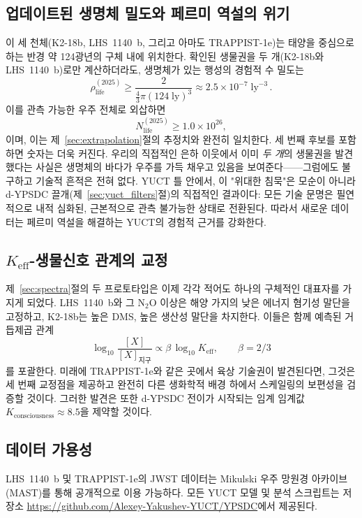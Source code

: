 \documentclass[11pt,a4paper]{article}
\begin{document}
	\subsection{업데이트된 생명체 밀도와 페르미 역설의 위기}
	이 세 천체(K2-18b, LHS~1140~b, 그리고 아마도 TRAPPIST-1e)는 태양을 중심으로 하는 반경 약 124광년의 구체 내에 위치한다. 확인된 생물권을 두 개(K2-18b와 LHS~1140~b)로만 계산하더라도, 생명체가 있는 행성의 경험적 수 밀도는
	\begin{equation}
		\rho_{\mathrm{life}}^{(2025)} \ge \frac{2}{\frac{4}{3}\pi (124\;\mathrm{ly})^{3}} \approx 2.5\times10^{-7}\;\mathrm{ly}^{-3}\, .
	\end{equation}
	이를 관측 가능한 우주 전체로 외삽하면
	\begin{equation}
		N_{\mathrm{life}}^{(2025)} \ge 1.0\times10^{26} ,
	\end{equation}
	이며, 이는 제~\ref{sec:extrapolation}절의 추정치와 완전히 일치한다. 세 번째 후보를 포함하면 숫자는 더욱 커진다. 우리의 직접적인 은하 이웃에서 이미 \emph{두 개}의 생물권을 발견했다는 사실은 생명체의 바다가 우주를 가득 채우고 있음을 보여준다——그럼에도 불구하고 기술적 흔적은 전혀 없다. YUCT 틀 안에서, 이 "위대한 침묵"은 모순이 아니라 d-YPSDC 끌개(제~\ref{sec:yuct_filters}절)의 직접적인 결과이다: 모든 기술 문명은 필연적으로 내적 심화된, 근본적으로 관측 불가능한 상태로 전환된다. 따라서 새로운 데이터는 페르미 역설을 해결하는 YUCT의 경험적 근거를 강화한다.
	
	\subsection{\(K_{\mathrm{eff}}\)-생물신호 관계의 교정}
	제~\ref{sec:spectra}절의 두 프로토타입은 이제 각각 적어도 하나의 구체적인 대표자를 가지게 되었다. LHS~1140~b와 그 N$_2$O 이상은 해양 가지의 낮은 에너지 혐기성 말단을 고정하고, K2-18b는 높은 DMS, 높은 생산성 말단을 차지한다. 이들은 함께 예측된 거듭제곱 관계
	\begin{equation}
		\log_{10} \frac{[X]}{[X]_{\mathrm{지구}}} \propto \beta\,\log_{10} K_{\mathrm{eff}} ,\qquad \beta=2/3
	\end{equation}
	를 포괄한다. 미래에 TRAPPIST-1e와 같은 곳에서 육상 기술권이 발견된다면, 그것은 세 번째 교정점을 제공하고 완전히 다른 생화학적 배경 하에서 스케일링의 보편성을 검증할 것이다. 그러한 발견은 또한 d-YPSDC 전이가 시작되는 임계 임계값 \(K_{\mathrm{consciousness}}\approx 8.5\)을 제약할 것이다.
	
	\subsection*{데이터 가용성}
	LHS~1140~b 및 TRAPPIST-1e의 JWST 데이터는 Mikulski 우주 망원경 아카이브(MAST)를 통해 공개적으로 이용 가능하다. 모든 YUCT 모델 및 분석 스크립트는 저장소 \url{https://github.com/Alexey-Yakushev-YUCT/YPSDC}에서 제공된다.
	
\end{document}
